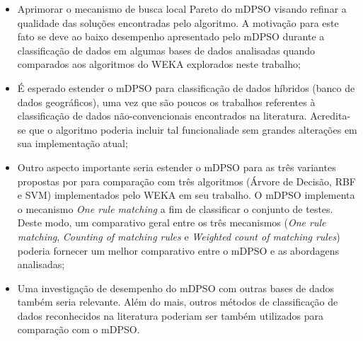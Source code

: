 \documentclass[
	12pt,				%
	openany,			%
	oneside,	
	a4paper,			%
	brazil,				%
	]{unimontes-ppgmsc-abntex2}
\begin{document}
\begin{itemize}
\item Aprimorar o mecanismo de busca local Pareto do mDPSO visando refinar a qualidade das soluções encontradas pelo algoritmo. A motivação para este fato se deve ao baixo desempenho apresentado pelo mDPSO durante a classificação de dados em algumas bases de dados analisadas quando comparados aos algoritmos do WEKA explorados neste trabalho;

\item É esperado estender o mDPSO para classificação de dados híbridos (banco de dados geográficos), uma vez que são poucos os trabalhos referentes à classificação de dados não-convencionais encontrados na literatura. Acredita-se que o algoritmo poderia incluir tal funcionaliade sem grandes alterações em sua implementação atual;

\item Outro aspecto importante seria estender o mDPSO para as três variantes propostas por  para comparação com três algoritmos (Árvore de Decisão, RBF e SVM) implementados pelo WEKA em seu trabalho. O mDPSO implementa o mecanismo {\em One rule matching} a fim de classificar o conjunto de testes. Deste modo, um comparativo geral entre os três mecanismos ({\em One rule matching}, {\em Counting of matching rules} e {\em Weighted count of matching rules}) poderia fornecer um melhor comparativo entre o mDPSO e as abordagens analisadas;

\item Uma investigação de desempenho do mDPSO com outras bases de dados também seria relevante. Além do mais, outros métodos de classificação de dados reconhecidos na literatura poderiam ser também utilizados para comparação com o mDPSO.
\end{itemize}



\postextual

\renewcommand{\bibname}{Refer\^encias Bibliogr\'aficas}


\printindex
\end{document}
